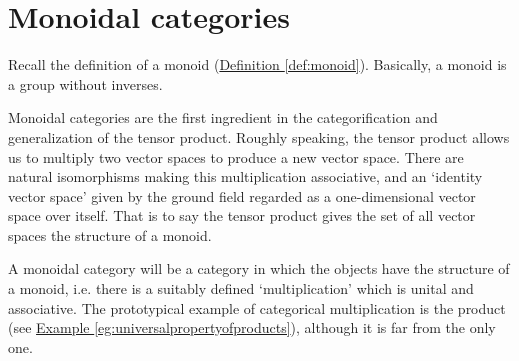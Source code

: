 \documentclass[a4paper,10pt]{scrreprt}
\theoremstyle{definition}
\theoremstyle{plain}
\theoremstyle{remark}
\begin{document}
\section{Monoidal categories} \label{sec:monoidalcategories}
Recall the definition of a monoid (\hyperref[def:monoid]{Definition \ref*{def:monoid}}). Basically, a monoid is a group without inverses. 

Monoidal categories are the first ingredient in the categorification and generalization of the tensor product. Roughly speaking, the tensor product allows us to multiply two vector spaces to produce a new vector space. There are natural isomorphisms making this multiplication associative, and an `identity vector space' given by the ground field regarded as a one-dimensional vector space over itself. That is to say the tensor product gives the set of all vector spaces the structure of a monoid.

A monoidal category will be a category in which the objects have the structure of a monoid, i.e. there is a suitably defined `multiplication' which is unital and associative. The prototypical example of categorical multiplication is the product (see \hyperref[eg:universalpropertyofproducts]{Example \ref*{eg:universalpropertyofproducts}}), although it is far from the only one.
\end{document}
